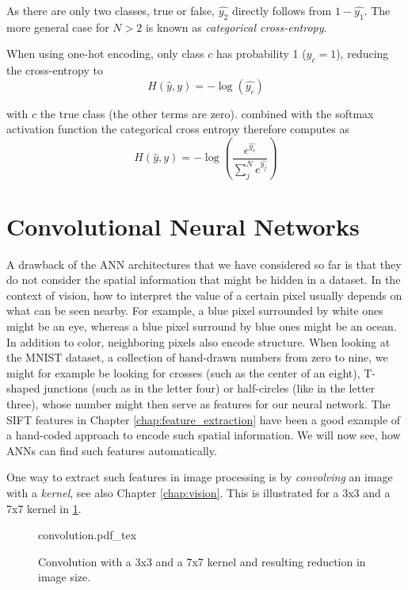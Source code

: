 As there are only two classes, true or false, $\hat{y_2}$ directly follows from $1-\hat{y_1}$. 
The more general case for $N>2$ is known as \textsl{categorical cross-entropy}.

When using one-hot encoding, only class $c$ has probability 1 ($y_c=1$), reducing the cross-entropy to 
\begin{equation}
H(\hat{y},y)=-\log(\hat{y_c})
\end{equation}

with $c$ the true class (the other terms are zero). 
combined with the softmax activation function the categorical cross entropy therefore computes as
\begin{equation}
H(\hat{y},y) = -\log\left(\frac{e^{\hat{y_c}}}{\sum_{j}^N e^{\hat{y_j}}}\right)
\end{equation}


\section{Convolutional Neural Networks}
A drawback of the ANN architectures that we have considered so far is that they do not consider the spatial information that might be hidden in a dataset. 
In the context of vision, how to interpret the value of a certain pixel usually depends on what can be seen nearby. For example, a blue pixel surrounded by white ones might be an eye, whereas a blue pixel surround by blue ones might be an ocean. In addition to color, neighboring pixels also encode structure. When looking at the MNIST dataset, a collection of hand-drawn numbers from zero to nine, we might for example be looking for crosses (such as the center of an eight), T-shaped junctions (such as in the letter four) or half-circles (like in the letter three), whose number might then serve as features for our neural network. The SIFT features in Chapter \ref{chap:feature_extraction} have been a good example of a hand-coded approach to encode such spatial information. We will now see, how ANNs can find such features automatically.

One way to extract such features in image processing is by \textsl{convolving} an image with a \textsl{kernel}, see also Chapter \ref{chap:vision}. This is illustrated for a 3x3 and a 7x7 kernel in \cref{fig:convolution}.


\begin{figure}[htb]
    \centering
    \def\svgwidth{0.8\textwidth}
    {convolution.pdf_tex}
    \caption{Convolution with a 3x3 and a 7x7 kernel and resulting reduction in image size.\label{fig:convolution}}
\end{figure}

